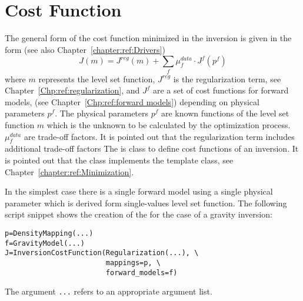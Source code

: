 \chapter{Cost Function}\label{chapter:ref:inversion cost function}
The general form of the cost function minimized in the inversion is given in the form (see also Chapter~\ref{chapter:ref:Drivers})
\begin{equation}\label{REF:EQU:DRIVE:10}
J(m) = J^{reg}(m) + \sum_{f} \mu^{data}_{f} \cdot J^{f}(p^f)
\end{equation} 
where $m$ represents the level set function, $J^{reg}$ is the regularization term, see Chapter~\ref{Chp:ref:regularization},
and $J^{f}$ are a set of cost functions for forward models, (see Chapter~\ref{Chp:ref:forward models}) depending on 
physical parameters $p^f$.  The physical parameters $p^f$ are known functions 
of the  level set function $m$ which is the unknown to be calculated by the optimization process. 
$\mu^{data}_{f}$ are trade-off factors. It is pointed out that the regularization term includes additional trade-off factors 
The  is class to define cost functions of an inversion. It is pointed out that
the  class implements the  template class, see Chapter~\ref{chapter:ref:Minimization}.

In the simplest case there is a single forward model using a single physical parameter which is 
derived form single-values level set function. The following script snippet shows the creation of the
 for the case of a gravity inversion:
\begin{verbatim}
p=DensityMapping(...)
f=GravityModel(...)
J=InversionCostFunction(Regularization(...), \
                        mappings=p, \
                        forward_models=f)
\end{verbatim}
The argument \verb|...| refers to an appropriate argument list.

